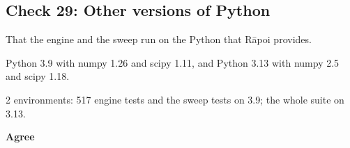 \subsection*{Check 29: Other versions of Python}

\begin{description}\setlength\itemsep{0pt}

\item[What was checked] That the engine and the sweep run on the Python that R\=apoi provides.

\item[Checked against] Python 3.9 with numpy 1.26 and scipy 1.11, and Python 3.13 with numpy 2.5 and scipy 1.18.

\item[How many] 2 environments: 517 engine tests and the sweep tests on 3.9; the whole suite on 3.13.

\item[Result] \textbf{Agree}

\end{description}

